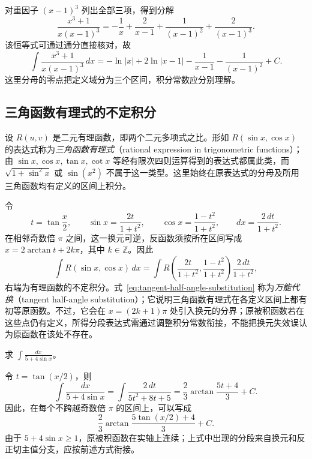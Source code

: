 \documentclass[UTF8,12pt,a4paper,fontset=fandol]{ctexbook}
\begin{document}
\begin{solve}
对重因子 $(x-1)^3$ 列出全部三项，得到分解
\[
    \frac{x^3+1}{x(x-1)^3}
      =-\frac1x+\frac2{x-1}+\frac1{(x-1)^2}+\frac2{(x-1)^3}.
\]
该恒等式可通过通分直接核对，故
\[
    \int\frac{x^3+1}{x(x-1)^3}\,dx
      =-\ln|x|+2\ln|x-1|-\frac1{x-1}-\frac1{(x-1)^2}+C.
\]
这里分母的零点把定义域分为三个区间，积分常数应分别理解。
\end{solve}

\subsection{三角函数有理式的不定积分}
\label{subsec:integrals-of-rational-trigonometric-expressions}

设 $R(u,v)$ 是二元有理函数，即两个二元多项式之比。形如 $R(\sin x,\cos x)$ 的表达式称为\emph{三角函数有理式}（rational expression in trigonometric functions）；由 $\sin x,\cos x,\tan x,\cot x$ 等经有限次四则运算得到的表达式都属此类，而 $\sqrt{1+\sin^2x}$ 或 $\sin(x^2)$ 不属于这一类型。这里始终在原表达式的分母及所用三角函数均有定义的区间上积分。

令
\begin{equation}
    t=\tan\frac x2,\qquad
    \sin x=\frac{2t}{1+t^2},\qquad
    \cos x=\frac{1-t^2}{1+t^2},\qquad
    dx=\frac{2\,dt}{1+t^2}.
    \label{eq:tangent-half-angle-substitution}
\end{equation}
在相邻奇数倍 $\pi$ 之间，这一换元可逆，反函数须按所在区间写成 $x=2\arctan t+2k\pi$，其中 $k\in\mathbb{Z}$。因此
\begin{equation}
    \int R(\sin x,\cos x)\,dx
      =\int R\left(\frac{2t}{1+t^2},\frac{1-t^2}{1+t^2}\right)
             \frac{2\,dt}{1+t^2},
    \label{eq:rationalization-of-trigonometric-integral}
\end{equation}
右端为有理函数的不定积分。式~\eqref{eq:tangent-half-angle-substitution} 称为\emph{万能代换}（tangent half-angle substitution）；它说明三角函数有理式在各定义区间上都有初等原函数。不过，它会在 $x=(2k+1)\pi$ 处引入换元的分界；原被积函数若在这些点仍有定义，所得分段表达式需通过调整积分常数衔接，不能把换元失效误认为原函数在该处不存在。

\begin{example}
\label{ex:tangent-half-angle-integral}
求 $\displaystyle\int\frac{dx}{5+4\sin x}$。
\end{example}

\begin{solve}
令 $t=\tan(x/2)$，则
\[
    \int\frac{dx}{5+4\sin x}
      =\int\frac{2\,dt}{5t^2+8t+5}
      =\frac23\arctan\frac{5t+4}{3}+C.
\]
因此，在每个不跨越奇数倍 $\pi$ 的区间上，可以写成
\[
    \frac23\arctan\frac{5\tan(x/2)+4}{3}+C.
\]
由于 $5+4\sin x\geq1$，原被积函数在实轴上连续；上式中出现的分段来自换元和反正切主值分支，应按前述方式衔接。
\end{solve}
\end{document}
